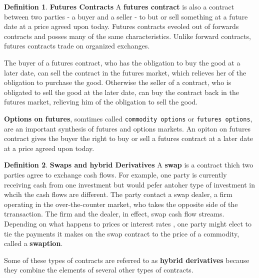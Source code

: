 \documentclass{book}
\theoremstyle{definition}
\newtheorem{definition}{Definition}[section]
\theoremstyle{remark}
\begin{document}
    \begin{definition} {\textbf{Futures Contracts}}
        A \textbf{futures contract} is also a contract between two parties - a buyer and a seller - to but or sell something at a future date at a price agreed upon today. Futures contracts eveoled out of forwards contracts and posses many of the same characteristics. Unlike forward contracts, futures contracts trade on organized exchanges.  
        
        The buyer of a futures contract, who has the obligation to buy the good at a later date, can sell the contract in the futures market, which relieves her of the obligation to purchase the good. Otherwise the seller of a contract, who is obligated to sell the good at the later date, can buy the contract back in the futures market, relieving him of the obligation to sell the good.  
        
        
        \textbf{Options on futures}, somtimes called \texttt{commodity options} or \texttt{futures options}, are an important synthesis of futures and options markets. An opiton on futures contract gives the buyer the right to buy or sell a futures contract at a later date at a price agreed upon today. 
    \end{definition}
    
    \begin{definition}{\textbf{Swaps and hybrid Derivatives}}
        A \textbf{swap} is a contract thich two parties agree to exchange cash flows. For example, one party is currently receiving cash from one investment but would pefer antoher type of investment in whcih the cash flows are different. The party contact a swap dealer, a firm operating in the over-the-counter market, who takes the opposite side of the trransaction. The firm and the dealer, in effect, swap cash flow streams. Depending on what happens to prices or interest rates , one party might elect to tie the payments it makes on the swap contract to the price of a commodity, called a \textbf{swaption}.
        
        Some of these types of contracts are referred to as \textbf{hybrid derivatives} because they combine the elements of several other types of contracts. 
    \end{definition}
\end{document}
